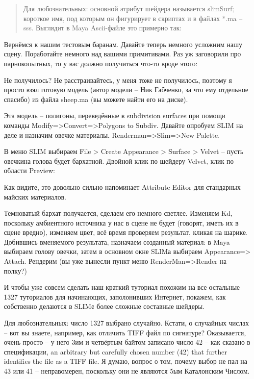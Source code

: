 \begin{quotation}
Для любознательных: основной атрибут шейдера называется slimSurf; короткое имя, под которым он фигурирует в скриптах и в файлах *.ma –
sss. Выглядит в Maya Ascii-файле это примерно так:
\end{quotation}


 Вернёмся к нашим тестовым баранам. Давайте теперь
    немного усложним нашу сцену. Поработайте немного над вашими
    примитивами. Раз уж заговорили про парнокопытных, то у вас должно
    получиться что-то вроде этого:


 Не получилось? Не расстраивайтесь, у меня тоже не
    получилось, поэтому я просто взял готовую модель (автор модели –
    Ник Габченко, за что ему отдельное спасибо) из файла sheep.ma (вы
    можете найти его на диске).

 Эта модель – полигоны, переведённые в subdivision
    surfaces при помощи команды Modify=>Convert=>Polygons to
    Subdiv. Давайте опробуем SLIM на деле и назначим овечке материалы.
    Renderman=>Slim=>New Palette.


 В меню SLIM выбираем File > Create Appearance
    > Surface > Velvet – пусть овечкина голова будет бархатной.
    Двойной клик по шейдеру Velvet, клик по области Preview:


 Как видите, это довольно сильно напоминает Attribute Editor для
    стандарных майских материалов.

 Темноватый бархат получается, сделаем его немного
    светлее. Изменяем Kd, поскольку амбиентного источника у нас в сцене
    не будет (говорят, иметь их в сцене вредно), изменяем цвет, всё
    время проверяем результат, кликая на шарике. Добившись вменяемого
    результата, назначаем созданный материал: в Maya выбираем голову
    овечки, затем в основном окне SLIMа выбираем Appearance=>
    Attach. Рендерим (вы уже вынесли пункт меню RenderMan=>Render на
    полку?)


 И чтобы уже совсем сделать наш краткий туториал
    похожим на все остальные 1327 туториалов для начинающих,
    заполонивших Интернет, покажем, как собственно делаются в SLIMе
    более сложные составные шейдеры.

 Для
    любознательных: число 1327 выбрано
    случайно. Кстати, о случайных числах – вот вы знаете, например, как
    отличить TIFF файл по сигнатуре? Оказывается, очень просто – у него
    3им и четвёртым байтом записано число 42 – как сказано в
    спецификации, an arbitrary but carefully chosen number (42) that
    further identifies the file as a TIFF file. Я думаю, вопрос о том,
    почему выбор не пал на  43 или 41 – неправомерен, поскольку они не являются 5ым Каталонским
    Числом.

